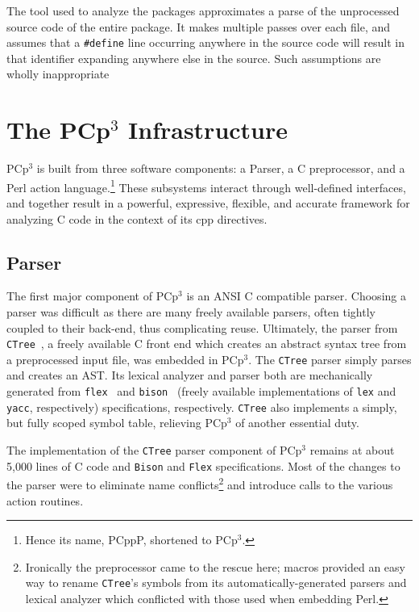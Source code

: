 \documentclass{article}
\newcommand{\pcp}{\mbox{\textsf{PCp}$^3$}}
\newcommand{\pcppp}{\mbox{\textsf{PCppP}}}
\newcommand{\Cpp}{\mbox{\textsf{cpp}}}
\newcommand{\Perl}{\mbox{\textsf{Perl}}}
\newcommand{\C}{\mbox{\textsf{C}}}
\newcommand{\ppd}[1]{\texttt{\##1}}
\begin{document}
The tool used to analyze the packages approximates a parse of the
unprocessed source code of the entire package.  It makes multiple passes
over each file, and assumes that a \ppd{define} line occurring anywhere
in the source code will result in that identifier expanding anywhere
else in the source.  Such assumptions are wholly inappropriate 

\section{The \pcp{} Infrastructure}
\label{sec:pcp3}
\pcp{} is built from three software components: a \textsf{P}arser, a \textsf{C}
\textsf{p}re\textsf{p}rocessor, and a \textsf{P}erl action
language.\footnote{Hence its name, \pcppp{}, shortened to \pcp{}.}
These subsystems interact through well-defined interfaces, and together
result in a powerful, expressive, flexible, and accurate framework for
analyzing \C{} code in the context of its \Cpp{} directives.

\subsection{Parser}

The first major component of \pcp{} is an ANSI \C{} compatible parser.
Choosing a parser was difficult as there are many freely available
parsers, often tightly coupled to their back-end, thus complicating
reuse.  Ultimately, the parser from \texttt{CTree}~\cite{CTree}, a
freely available \C{} front end which creates an abstract syntax tree
from a preprocessed input file, was embedded in \pcp{}.  The
\texttt{CTree} parser simply parses and creates an AST.  Its lexical analyzer and
parser both are mechanically generated from
\texttt{flex}~\cite{Flex,Levine92} and
\texttt{bison}~\cite{Bison,Levine92} (freely available implementations
of \texttt{lex} and \texttt{yacc}, respectively) specifications,
respectively.  \texttt{CTree} also implements a simply, but fully scoped
symbol table, relieving \pcp{} of another essential duty.

The implementation of the \texttt{CTree} parser component of \pcp{}
remains at about 5,000 lines of \C{} code and \texttt{Bison} and
\texttt{Flex} specifications.  Most of the changes to the parser were to
eliminate name conflicts\footnote{Ironically the preprocessor came to the
  rescue here; macros provided an easy way to rename \texttt{CTree}'s
  symbols from its automatically-generated parsers and lexical analyzer
  which conflicted with those used when embedding \Perl{}.}  and
introduce calls to the various action routines.
\end{document}
